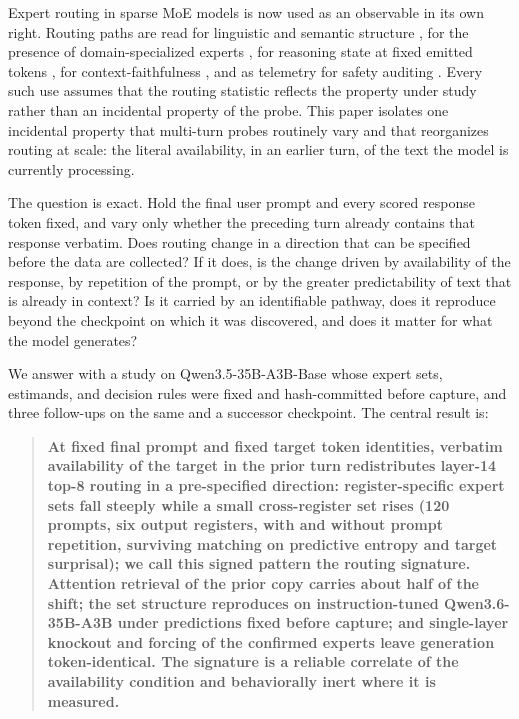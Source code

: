 \documentclass[10pt,a4paper,twocolumn]{article}
\begin{document}
Expert routing in sparse MoE models is now used as an observable in its own
right. Routing paths are read for linguistic and semantic structure
\cite{antoine2025,olson2025}, for the presence of domain-specialized experts
\cite{wang2026dbes,wang2026}, for reasoning state at fixed emitted tokens
\cite{chen2026}, for context-faithfulness \cite{bai2025}, and as telemetry
for safety auditing \cite{lv2026}. Every such use assumes that the routing
statistic reflects the property under study rather than an incidental
property of the probe. This paper isolates one incidental property that
multi-turn probes routinely vary and that reorganizes routing at scale: the
literal availability, in an earlier turn, of the text the model is currently
processing.

The question is exact. Hold the final user prompt and every scored response
token fixed, and vary only whether the preceding turn already contains that
response verbatim. Does routing change in a direction that can be specified
before the data are collected? If it does, is the change driven by
availability of the response, by repetition of the prompt, or by the greater
predictability of text that is already in context? Is it carried by an
identifiable pathway, does it reproduce beyond the checkpoint on which it was
discovered, and does it matter for what the model generates?

We answer with a study on Qwen3.5-35B-A3B-Base whose expert sets, estimands,
and decision rules were fixed and hash-committed before capture, and three
follow-ups on the same and a successor checkpoint. The central result is:

\begin{quote}
\textbf{At fixed final prompt and fixed target token identities, verbatim
availability of the target in the prior turn redistributes layer-14 top-8
routing in a pre-specified direction: register-specific expert sets fall
steeply while a small cross-register set rises (120 prompts, six output
registers, with and without prompt repetition, surviving matching on
predictive entropy and target surprisal); we call this signed pattern the
routing signature. Attention retrieval of the prior
copy carries about half of the shift; the set structure reproduces on
instruction-tuned Qwen3.6-35B-A3B under predictions fixed before capture;
and single-layer knockout and forcing of the confirmed experts leave
generation token-identical. The signature is a reliable correlate of the
availability condition and behaviorally inert where it is measured.}
\end{quote}
\end{document}
